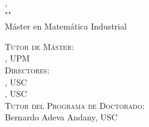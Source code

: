 \thispagestyle{empty}
\begin{titlingpage}
  \newpage
\thispagestyle{empty}

\hfill

\vfill

\noindent\myName,\\ "{\myTitle}" \\%
Máster en Matemática Industrial

\bigskip

\noindent\textsc{Tutor de Máster}: \\
\mySupervisor, UPM\\
\noindent\textsc{Directores}: \\
\myProf, USC\\
\myOtherProf, USC\\
\noindent\textsc{Tutor del Programa de Doctorado}: \\
Bernardo Adeva Andany, USC\\



\end{titlingpage}
